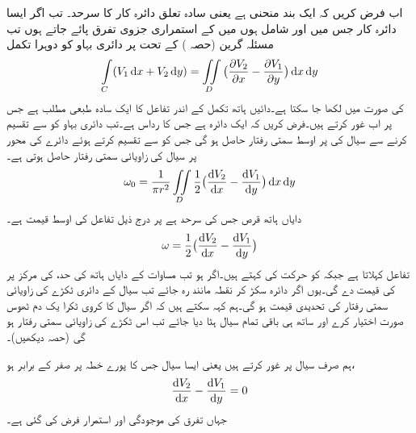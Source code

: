 اب فرض کریں کہ  ایک بند منحنی ہے یعنی سادہ تعلق دائرہ کار  کا سرحد۔ تب اگر ایسا دائرہ کار جس میں  اور  شامل ہوں  میں  کے استمراری جزوی تفرق پائے جاتے ہوں  تب مسئلہ گرین (حصہ ) کے تحت  پر دائری بہاو کو دوہرا تکمل
\begin{align}
\int\limits_C (V_1\dif x+V_2\dif y)=\iint\limits_D \big(\frac{\partial V_2}{\partial x}-\frac{\partial V_1}{\partial y}\big)\dif x\dif y
\end{align}
کی صورت میں لکھا جا سکتا ہے۔دائیں ہاتھ تکمل کے اندر تفاعل کا ایک سادہ طبعی مطلب ہے جس پر اب غور کرتے ہیں۔فرض کریں کہ  ایک دائرہ ہے جس کا  رداس   ہے۔تب دائری بہاو کو  سے تقسیم کرنے سے  سیال کی  پر اوسط سمتی رفتار حاصل ہو گی جس کو  سے تقسیم کرتے ہوئے  دائرے کی محور پر سیال کی زاویائی سمتی رفتار  حاصل ہوتی ہے۔
\begin{align}\label{مساوات_مخفی_قوہ_گرداب_الف}
\omega_0=\frac{1}{\pi r^2}\iint\limits_D \frac{1}{2}\big(\frac{\dif V_2}{\dif x}-\frac{\dif V_1}{\dif y}\big)\dif x\dif y
\end{align}
دایاں ہاتھ قرص  جس کی سرحد  ہے  پر درج ذیل تفاعل کی اوسط قیمت ہے۔
\begin{align}
\omega=\frac{1}{2}\big(\frac{\dif V_2}{\dif x}-\frac{\dif V_1}{\dif y}\big)
\end{align} 
تفاعل   کہلاتا ہے جبکہ  کو حرکت کی  کہتے ہیں۔اگر  ہو تب مساوات  کے دایاں ہاتھ کی حد،  کی مرکز پر   کی قیمت دے گی۔یوں اگر دائرہ  سکڑ کر نقطہ  مانند رہ جائے تب سیال کے دائری ٹکڑے کی زاویائی سمتی رفتار کی تحدیدی قیمت   ہو گی۔ہم کہہ سکتے ہیں کہ اگر سیال کا کروی ٹکرا یک دم ٹھوس صورت اختیار کرے اور ساتھ ہی باقی تمام سیال ہٹا دیا جائے تب اس ٹکڑے کی زاویائی سمتی رفتار   ہو گی (حصہ  دیکھیں)۔

ہم صرف  سیال پر غور کرتے ہیں یعنی ایسا سیال جس کا  پورے خطہ   پر صفر کے برابر ہو،
\begin{align*}
\frac{\dif V_2}{\dif x}-\frac{\dif V_1}{\dif y}=0
\end{align*} 
جہاں تفرق کی موجودگی اور استمرار فرض کی گئی ہے۔

